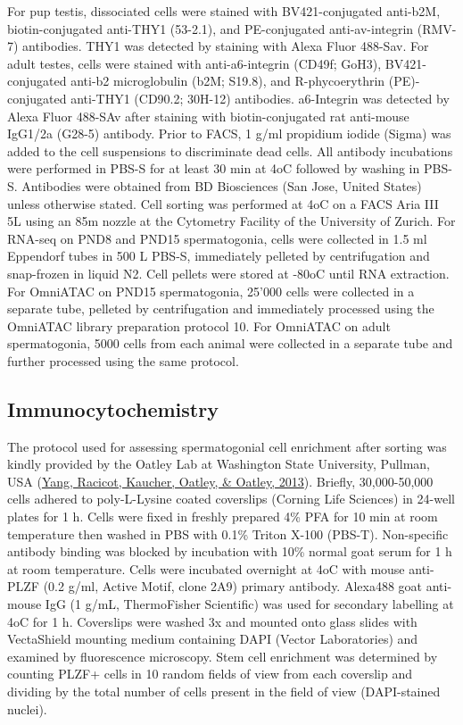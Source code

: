 \documentclass[12pt,twoside]{reedthesis}
\begin{document}
For pup testis, dissociated cells were stained with BV421-conjugated
anti-b2M, biotin-conjugated anti-THY1 (53-2.1), and
PE-conjugated anti-av-integrin (RMV-7) antibodies. THY1 was
detected by staining with Alexa Fluor 488-Sav. For adult testes, cells
were stained with anti-a6-integrin (CD49f; GoH3),
BV421-conjugated anti-b2 microglobulin (b2M; S19.8), and
R-phycoerythrin (PE)-conjugated anti-THY1 (CD90.2; 30H-12) antibodies.
a6-Integrin was detected by Alexa Fluor 488-SAv after staining
with biotin-conjugated rat anti-mouse IgG1/2a (G28-5) antibody. Prior to
FACS, 1 \textmu g/ml propidium iodide (Sigma) was added to the cell
suspensions to discriminate dead cells. All antibody incubations were
performed in PBS-S for at least 30 min at 4oC followed by washing in
PBS-S. Antibodies were obtained from BD Biosciences (San Jose, United
States) unless otherwise stated. Cell sorting was performed at 4oC on a
FACS Aria III 5L using an 85\textmu m nozzle at the Cytometry Facility
of the University of Zurich. For RNA-seq on PND8 and PND15
spermatogonia, cells were collected in 1.5 ml Eppendorf tubes in 500
\textmu L PBS-S, immediately pelleted by centrifugation and snap-frozen
in liquid N2. Cell pellets were stored at -80oC until RNA extraction.
For OmniATAC on PND15 spermatogonia, 25'000 cells were collected in a
separate tube, pelleted by centrifugation and immediately processed
using the OmniATAC library preparation protocol 10. For OmniATAC on
adult spermatogonia, 5000 cells from each animal were collected in a
separate tube and further processed using the same protocol.

\hypertarget{immunocytochemistry}{%
\subsection{Immunocytochemistry}\label{immunocytochemistry}}

The protocol used for assessing spermatogonial cell enrichment after
sorting was kindly provided by the Oatley Lab at Washington State
University, Pullman, USA (\protect\hyperlink{ref-yang2013}{Yang, Racicot, Kaucher, Oatley, \& Oatley, 2013}). Briefly, 30,000-50,000 cells
adhered to poly-L-Lysine coated coverslips (Corning Life Sciences) in
24-well plates for 1 h. Cells were fixed in freshly prepared 4\% PFA for
10 min at room temperature then washed in PBS with 0.1\% Triton X-100
(PBS-T). Non-specific antibody binding was blocked by incubation with
10\% normal goat serum for 1 h at room temperature. Cells were incubated
overnight at 4oC with mouse anti-PLZF (0.2 \textmu g/ml, Active Motif,
clone 2A9) primary antibody. Alexa488 goat anti-mouse IgG (1 \textmu
g/mL, ThermoFisher Scientific) was used for secondary labelling at 4oC
for 1 h. Coverslips were washed 3x and mounted onto glass slides with
VectaShield mounting medium containing DAPI (Vector Laboratories) and
examined by fluorescence microscopy. Stem cell enrichment was determined
by counting PLZF+ cells in 10 random fields of view from each coverslip
and dividing by the total number of cells present in the field of view
(DAPI-stained nuclei).
\end{document}
